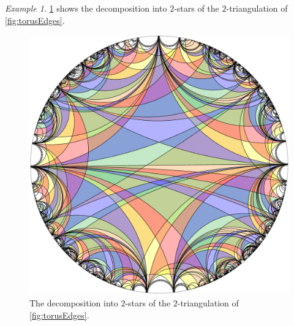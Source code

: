 \documentclass{amsart}
\theoremstyle{remark}
\newtheorem{remark}[theorem]{Remark}
\newtheorem{example}[theorem]{Example}
\begin{document}
\begin{example}
\cref{fig:torusStars} shows the decomposition into $2$-stars of the $2$-triangulation of \cref{fig:torusEdges}.

\begin{figure}[h]
	\capstart
	\centerline{\includegraphics[scale=.42]{torus/torusStars}}
	\caption{The decomposition into $2$-stars of the $2$-triangulation of \cref{fig:torusEdges}.}
	\label{fig:torusStars}
\end{figure}
\end{example}

%

\end{document}
